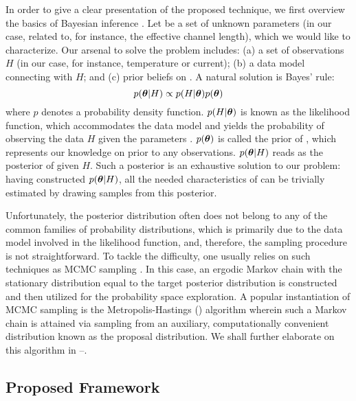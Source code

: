 In order to give a clear presentation of the proposed technique, we first
overview the basics of Bayesian inference \cite{gelman2004}. Let \vt be a set of
unknown parameters (in our case, related to, for instance, the effective channel
length), which we would like to characterize. Our arsenal to solve the problem
includes: (a) a set of observations $H$ (in our case, for instance, temperature
or current); (b) a data model connecting \vt with $H$; and (c) prior beliefs on
\vt. A natural solution is Bayes' rule:
\begin{equation} \elab{bayes-theorem}
  p(\vt | H) \propto p(H | \vt) p(\vt)
\end{equation}
where $p$ denotes a probability density function. $p(H | \boldsymbol{\theta})$ is known as the
likelihood function, which accommodates the data model and yields the
probability of observing the data $H$ given the parameters \vt. $p(\boldsymbol{\theta})$ is
called the prior of \vt, which represents our knowledge on \vt prior to any
observations. $p(\boldsymbol{\theta} | H)$ reads as the posterior of \vt given $H$. Such a
posterior is an exhaustive solution to our problem: having constructed $p(\boldsymbol{\theta} |
H)$, all the needed characteristics of \vt can be trivially estimated by drawing
samples from this posterior.

Unfortunately, the posterior distribution often does not belong to any of the
common families of probability distributions, which is primarily due to the data
model involved in the likelihood function, and, therefore, the sampling
procedure is not straightforward. To tackle the difficulty, one usually relies
on such techniques as \ac{MCMC} sampling \cite{gelman2004}. In this case, an
ergodic Markov chain with the stationary distribution equal to the target
posterior distribution is constructed and then utilized for the probability
space exploration. A popular instantiation of \ac{MCMC} sampling is the
Metropolis-Hastings () algorithm wherein such a Markov chain is attained
via sampling from an auxiliary, computationally convenient distribution known as
the proposal distribution. We shall further elaborate on this algorithm in
--.

\subsection{Proposed Framework}

